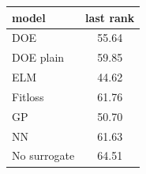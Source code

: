 \begin{tabular}{|lc|}
\hline
model & last rank\\
\hline
DOE & 55.64 \\
DOE plain & 59.85 \\
ELM & 44.62 \\
Fitloss & 61.76 \\
GP & 50.70 \\
NN & 61.63 \\
No surrogate & 64.51 \\
\hline
\end{tabular}
